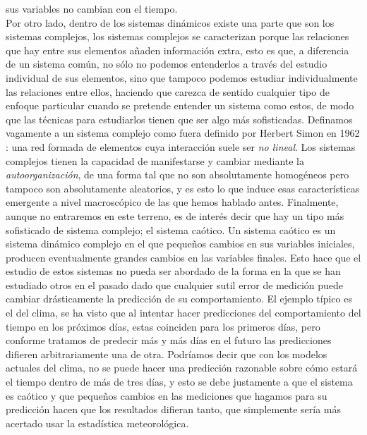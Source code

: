sus variables no cambian con el tiempo.\\
Por otro lado, dentro de los sistemas dinámicos existe una parte que son los sistemas complejos, los sistemas complejos se caracterizan porque las relaciones que hay entre sus elementos añaden información extra, esto es que, a diferencia de un sistema común, no sólo no podemos entenderlos a través del estudio individual de sus elementos, sino que tampoco podemos estudiar individualmente las relaciones entre ellos, haciendo que carezca de sentido cualquier tipo de enfoque particular cuando se pretende entender un sistema como estos, de modo que las técnicas para estudiarlos tienen que ser algo más sofisticadas. Definamos vagamente a un sistema complejo como fuera definido por Herbert Simon en 1962 \cite{weaver1991science}: una red formada de elementos cuya interacción suele ser  \textit{no lineal}. Los sistemas complejos tienen la capacidad de manifestarse y cambiar mediante la \textit{autoorganización}, de una forma tal que no son absolutamente homogéneos pero tampoco son absolutamente aleatorios, y es esto lo que induce esas características emergente a nivel macroscópico de las que hemos hablado antes. Finalmente, aunque no entraremos en este terreno, es de interés decir que hay un tipo más sofisticado de sistema complejo; el sistema caótico. Un sistema caótico es un sistema dinámico complejo en el que pequeños cambios en sus variables iniciales, producen eventualmente grandes cambios en las variables finales. Esto hace que el estudio de estos sistemas no pueda ser abordado de la forma en la que se han estudiado otros en el pasado dado que cualquier sutil error de medición puede cambiar drásticamente la predicción de su comportamiento. El ejemplo típico es el del clima, se ha visto que al intentar hacer predicciones del comportamiento del tiempo en los próximos días, estas coinciden para los primeros días, pero conforme tratamos de predecir más y más días en el futuro las predicciones difieren arbitrariamente una de otra. Podríamos decir que con los modelos actuales del clima, no se puede hacer una predicción razonable sobre cómo estará el tiempo dentro de más de tres días, y esto se debe justamente a que el sistema es caótico y que pequeños cambios en las mediciones que hagamos para su predicción hacen que los resultados difieran tanto, que simplemente sería más acertado usar la estadística meteorológica.\\
